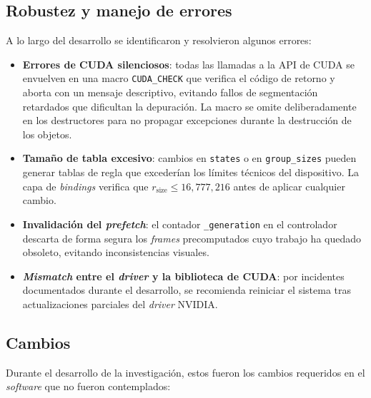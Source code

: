 \subsection{Robustez y manejo de errores}

A lo largo del desarrollo se identificaron y resolvieron algunos errores:

\begin{itemize}
    \item \textbf{Errores de CUDA silenciosos}: todas las llamadas a la API de CUDA se envuelven en una macro \texttt{CUDA\_CHECK} que verifica el código de retorno y aborta con un mensaje descriptivo, evitando fallos de segmentación retardados que dificultan la depuración. La macro se omite deliberadamente en los destructores para no propagar excepciones durante la destrucción de los objetos.
    \item \textbf{Tamaño de tabla excesivo}: cambios en \texttt{states} o en \texttt{group\_sizes} pueden generar tablas de regla que excederían los límites técnicos del dispositivo. La capa de \textit{bindings} verifica que $r_{\text{size}} \leq 16{,}777{,}216$ antes de aplicar cualquier cambio.
    \item \textbf{Invalidación del \textit{prefetch}}: el contador \texttt{\_generation} en el controlador descarta de forma segura los \textit{frames} precomputados cuyo trabajo ha quedado obsoleto, evitando inconsistencias visuales.
    \item \textbf{\textit{Mismatch} entre el \textit{driver} y la biblioteca de CUDA}: por incidentes documentados durante el desarrollo, se recomienda reiniciar el sistema tras actualizaciones parciales del \textit{driver} NVIDIA.
\end{itemize}

\subsection{Cambios}

Durante el desarrollo de la investigación, estos fueron los cambios requeridos en el \textit{software} que no fueron contemplados:

